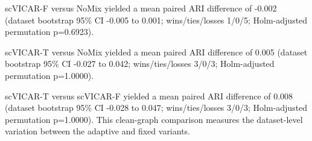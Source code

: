 

scVICAR-F versus NoMix yielded a mean paired ARI difference of -0.002 (dataset bootstrap 95\% CI -0.005 to 0.001; wins/ties/losses 1/0/5; Holm-adjusted permutation p=0.6923).

scVICAR-T versus NoMix yielded a mean paired ARI difference of 0.005 (dataset bootstrap 95\% CI -0.027 to 0.042; wins/ties/losses 3/0/3; Holm-adjusted permutation p=1.0000).

scVICAR-T versus scVICAR-F yielded a mean paired ARI difference of 0.008 (dataset bootstrap 95\% CI -0.028 to 0.047; wins/ties/losses 3/0/3; Holm-adjusted permutation p=1.0000). This clean-graph comparison measures the dataset-level variation between the adaptive and fixed variants.
